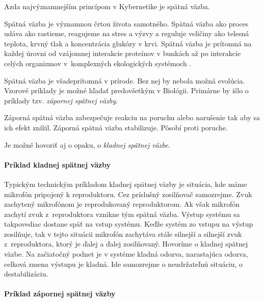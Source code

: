 \documentclass[a4paper, 10pt, ]{article}
\begin{document}
Azda najvýznamnejším princípom v Kybernetike je spätná väzba. 

Spätná väzba je významnou črtou života samotného. Spätná väzba ako proces udáva ako rastieme, reagujeme na stres a výzvy a reguluje veličiny ako telesná teplota, krvný tlak a koncentrácia glukózy v krvi. Spätná väzba je prítomná na každej úrovni od vzájomnej interakcie proteínov v bunkách až po interakcie celých organizmov v~komplexných ekologických systémoch \cite{Aastroem2020}.


Spätná väzba je všadeprítomná v prírode. Bez nej by nebola možná evolúcia. Vzorové príklady je možné hľadať predovšetkým v Biológii. Primárne by išlo o príklady tzv. \emph{zápornej spätnej väzby}.

Záporná spätná väzba zabezpečuje reakciu na poruchu alebo narušenie tak aby sa ich efekt znížil. Záporná spätná väzba stabilizuje. Pôsobí proti poruche.

Je možné hovoriť aj o opaku, o \emph{kladnej spätnej väzbe}. 


\paragraph{Príklad kladnej spätnej väzby}

Typickým technickým príkladom kladnej spätnej väzby je situácia, kde máme mikrofón pripojený k reproduktoru. Cez príslušný zosilňovač samozrejme. Zvuk zachytený mikrofónom je reprodukovaný reproduktorom. Ak však mikrofón zachytí zvuk z~reproduktora vznikne tým spätná väzba. Výstup systému sa takpovediac dostane späť na vstup systému. Keďže systém zo vstupu na výstup zosilňuje, tak v tejto situácii mikrofón zachytáva stále silnejší a silnejší zvuk z~reproduktora, ktorý je ďalej a ďalej zosilňovaný. Hovoríme o kladnej spätnej väzbe. Na začiatočný podnet je v systéme kladná odozva, narastajúca odozva, celková zmena výstupu je kladná. Ide samozrejme o neudržateľnú situáciu, o destabilizáciu.

\paragraph{Príklad zápornej spätnej väzby}
\end{document}
